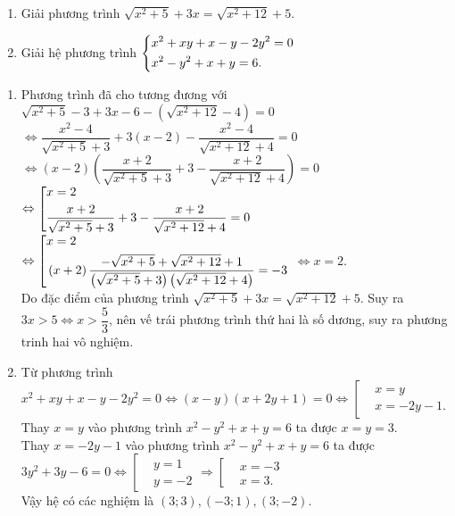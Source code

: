 \begin{ex}%
\hfill
    \begin{enumerate}    
        \item Giải phương trình $\sqrt{x^2+5}+3x=\sqrt{x^2+12}+5$.
        \item Giải hệ phương trình $\left\{\begin{aligned}&x^2+xy+x-y-2y^2=0\\&x^2-y^2+x+y=6.\end{aligned}\right.$
    \end{enumerate}
\loigiai
    {\begin{enumerate}
    		\item Phương trình đã cho tương đương với\\
    		$\sqrt {x^2+ 5}  - 3 + 3x - 6 - \left(\sqrt {x^2 + 12}  - 4\right) = 0$\\
    		$ \Leftrightarrow \dfrac{{x^2 - 4}}{{\sqrt {x^2 + 5}  + 3}} + 3\left( {x - 2} \right) - \dfrac{{x^2 - 4}}{{\sqrt {x^2+ 12}  + 4}} = 0$\\
    		$\Leftrightarrow \left( {x - 2} \right)\left( {\dfrac{{x + 2}}{{\sqrt {x^2+ 5}  + 3}} + 3 - \dfrac{{x + 2}}{{\sqrt {x^2 + 12}  + 4}}} \right) = 0$\\
    		$\Leftrightarrow \left[\begin{aligned}&x=2\\
    			&\dfrac{{x + 2}}{{\sqrt {x^2+ 5}  + 3}} + 3 - \dfrac{{x + 2}}{{\sqrt {x^2 + 12}  + 4}} = 0\end{aligned}\right.$\\
    		$\Leftrightarrow \left[\begin{aligned}&x=2\\
    			&\left(x+2\right)\dfrac{-\sqrt {x^2+ 5}  +\sqrt {x^2+ 12}  + 1}{\left(\sqrt {x^2+ 5}  + 3\right)\left(\sqrt {x^2+ 12}  + 4\right)}= -3\end{aligned}\right.$ $\Leftrightarrow x=2$.\\
    		Do đặc điểm của phương trình $\sqrt{x^2+5}+3x=\sqrt{x^2+12}+5$. Suy ra $3x>5 \Leftrightarrow x>\dfrac{5}{3} $, nên vế trái phương trình thứ hai là số dương, suy ra phương trinh hai vô nghiệm.
    		\item Từ phương trình $x^2+xy+x-y-2y^2=0\Leftrightarrow \left({x-y}\right)\left({x+2y+1}\right)=0\Leftrightarrow \left[\begin{aligned}& x=y \\
    		& x=-2y-1. 
    		\end{aligned}\right.$
    		Thay $x=y$ vào phương trình $x^2-y^2+x+y=6$ ta được $x=y=3$.\\
    		Thay $x=-2y-1$ vào phương trình $x^2-y^2+x+y=6$ ta được\\ $3y^2+3y-6=0\Leftrightarrow \left[\begin{aligned}& y=1 \\
    		& y=-2 
    		\end{aligned}\right.\Rightarrow \left[\begin{aligned}& x=-3 \\
    		& x=3. 
    		\end{aligned}\right.$\\
    		Vậy hệ có các nghiệm là $\left({3;3}\right),\left({-3;1}\right),\left({3;-2}\right)$. 
    	\end{enumerate}
    }
\end{ex}

